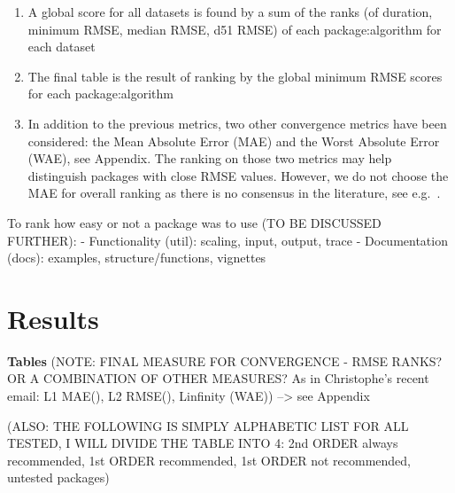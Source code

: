 \begin{enumerate}
\def\labelenumi{\arabic{enumi}.}
\setcounter{enumi}{3}
\tightlist
\item
  A global score for all datasets is found by a sum of the ranks (of
  duration, minimum RMSE, median RMSE, d51 RMSE) of each
  package:algorithm for each dataset
\item
  The final table is the result of ranking by the global minimum RMSE
  scores for each package:algorithm
\item
  In addition to the previous metrics, two other convergence metrics
  have been considered: the Mean Absolute Error (MAE) and the Worst
  Absolute Error (WAE), see Appendix. The ranking on those two metrics
  may help distinguish packages with close RMSE values. However, we do
  not choose the MAE for overall ranking as there is no consensus in the
  literature, see e.g.~\citep{willmott2005advantages,chai2014root}.
\end{enumerate}

To rank how easy or not a package was to use (TO BE DISCUSSED FURTHER):
- Functionality (util): scaling, input, output, trace - Documentation
(docs): examples, structure/functions, vignettes

\hypertarget{results}{%
\section{Results}\label{results}}

\textbf{Tables} (NOTE: FINAL MEASURE FOR CONVERGENCE - RMSE RANKS? OR A
COMBINATION OF OTHER MEASURES? As in Christophe's recent email: L1
MAE(), L2 RMSE(), Linfinity (WAE)) --\textgreater{} see Appendix

(ALSO: THE FOLLOWING IS SIMPLY ALPHABETIC LIST FOR ALL TESTED, I WILL
DIVIDE THE TABLE INTO 4: 2nd ORDER always recommended, 1st ORDER
recommended, 1st ORDER not recommended, untested packages)

